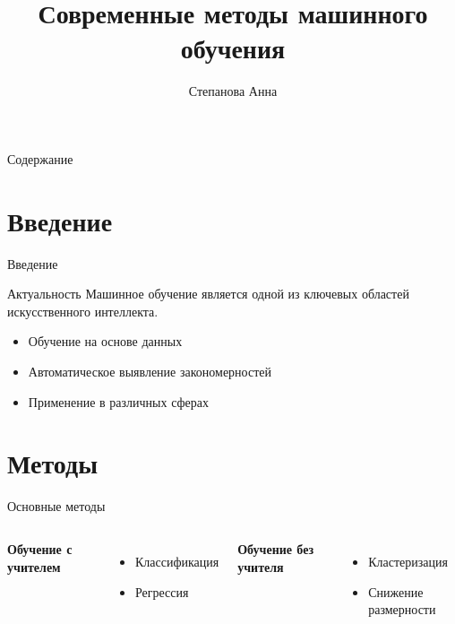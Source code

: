 \documentclass{beamer}
\title{Современные методы машинного обучения}
\author{Степанова Анна}
\institute{РГПУ им. А. И. Герцена}
\begin{document}
\begin{frame}
    \titlepage
\end{frame}

\begin{frame}{Содержание}
    \tableofcontents
\end{frame}

\section{Введение}

\begin{frame}{Введение}
    \begin{block}{Актуальность}
        Машинное обучение является одной из ключевых областей искусственного интеллекта.
    \end{block}
    
    \begin{itemize}
        \item<1-> Обучение на основе данных
        \item<2-> Автоматическое выявление закономерностей
        \item<3-> Применение в различных сферах
    \end{itemize}
\end{frame}

\section{Методы}

\begin{frame}{Основные методы}
    \begin{columns}[T]
        \textbf{Обучение с учителем}
        \begin{itemize}
            \item Классификация
            \item Регрессия
        \end{itemize}
        
        \textbf{Обучение без учителя}
        \begin{itemize}
            \item Кластеризация
            \item Снижение размерности
        \end{itemize}
    \end{columns}
\end{frame}
\end{document}
